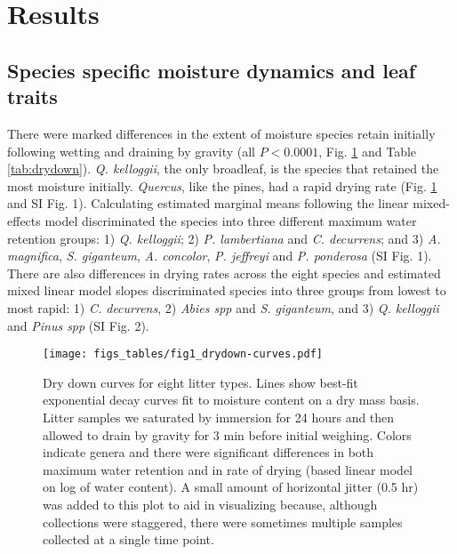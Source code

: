 \documentclass[letterpaper,12pt]{article}
\begin{document}
\section*{Results}

\subsection*{Species specific moisture dynamics and leaf traits}

There were marked differences in the extent of moisture species retain
initially following wetting and draining by gravity (all $P < 0.0001$, Fig.
\ref{fig:drydown} and Table \ref{tab:drydown}). \emph{Q. kelloggii}, the only
broadleaf, is the species that retained the most moisture initially.
\emph{Quercus}, like the pines, had a rapid drying rate (Fig. \ref{fig:drydown}
and SI Fig. 1). Calculating estimated marginal means following the linear
mixed-effects model discriminated the species into three different maximum
water retention groups: 1) \emph{Q. kelloggii}; 2) \emph{P. lambertiana} and
\emph{C. decurrens}; and 3) \emph{A. magnifica}, \emph{S. giganteum}, \emph{A.
  concolor}, \emph{P. jeffreyi} and \emph{P. ponderosa} (SI Fig. 1). There are
also differences in drying rates across the eight species and estimated
mixed linear model slopes discriminated species into three groups from lowest
to most rapid: 1) \emph{C. decurrens}, 2) \emph{Abies spp} and \emph{S.
  giganteum}, and 3) \emph{Q. kelloggii} and \emph{Pinus spp} (SI Fig. 2).

\begin{figure}[h]
  \centering
\texttt{[image: figs\_tables/fig1\_drydown-curves.pdf]}
\caption{Dry down curves for eight litter types. Lines show best-fit
  exponential decay curves fit to moisture content on a dry mass basis. Litter
  samples we saturated by immersion for 24 hours and then allowed to drain by
  gravity for 3 min before initial weighing. Colors indicate genera and there
  were significant differences in both maximum water retention and in rate of
  drying (based linear model on log of water content). A small amount of
  horizontal jitter (0.5 hr) was added to this plot to aid in visualizing
  because, although collections were staggered, there were sometimes multiple
  samples collected at a single time point.}
 \label{fig:drydown}
\end{figure}
\end{document}
